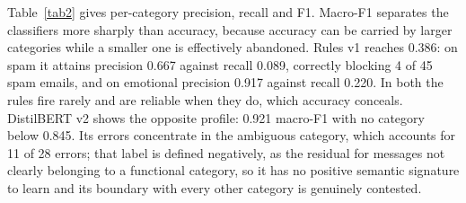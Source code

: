 \documentclass[conference]{IEEEtran}
\begin{document}
Table~\ref{tab2} gives per-category precision, recall and F1. Macro-F1 separates the classifiers more sharply than accuracy, because accuracy can be carried by larger categories while a smaller one is effectively abandoned. Rules v1 reaches 0.386: on spam it attains precision 0.667 against recall 0.089, correctly blocking 4 of 45 spam emails, and on emotional precision 0.917 against recall 0.220. In both the rules fire rarely and are reliable when they do, which accuracy conceals. DistilBERT v2 shows the opposite profile: 0.921 macro-F1 with no category below 0.845. Its errors concentrate in the ambiguous category, which accounts for 11 of 28 errors; that label is defined negatively, as the residual for messages not clearly belonging to a functional category, so it has no positive semantic signature to learn and its boundary with every other category is genuinely contested.
\end{document}
